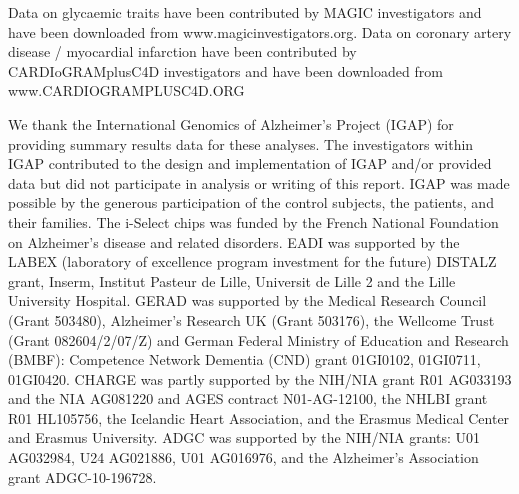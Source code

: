 \documentclass[11pt,titlepage]{article}
\begin{document}
Data on glycaemic traits have been contributed by MAGIC investigators and have been downloaded from www.magicinvestigators.org. Data on coronary artery disease / myocardial infarction have been contributed by CARDIoGRAMplusC4D investigators and have been downloaded from www.CARDIOGRAMPLUSC4D.ORG

We thank the International Genomics of Alzheimer's Project (IGAP) for providing summary results data for these analyses. The investigators within IGAP contributed to the design and implementation of IGAP and/or provided data but did not participate in analysis or writing of this report. IGAP was made possible by the generous participation of the control subjects, the patients, and their families. The i-Select chips was funded by the French National Foundation on Alzheimer's disease and related disorders. EADI was supported by the LABEX (laboratory of excellence program investment for the future) DISTALZ grant, Inserm, Institut Pasteur de Lille, Universit de Lille 2 and the Lille University Hospital. GERAD was supported by the Medical Research Council (Grant 503480), Alzheimer's Research UK (Grant 503176), the Wellcome Trust (Grant 082604/2/07/Z) and German Federal Ministry of Education and Research (BMBF): Competence Network Dementia
(CND) grant 01GI0102, 01GI0711, 01GI0420. CHARGE was partly supported by the NIH/NIA grant R01 AG033193 and the NIA AG081220 and AGES contract N01-AG-12100, the NHLBI grant R01 HL105756, the Icelandic Heart Association, and the Erasmus Medical Center and Erasmus University. ADGC was supported by the NIH/NIA grants: U01 AG032984, U24 AG021886, U01 AG016976, and the Alzheimer's Association grant ADGC-10-196728.


\end{document}
